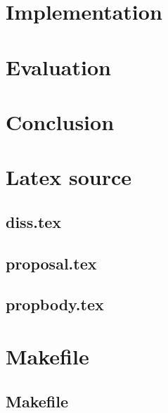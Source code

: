 \documentclass[12pt,twoside,notitlepage]{report}
\begin{document}
\cleardoublepage
\chapter{Implementation}




\cleardoublepage
\chapter{Evaluation}


\cleardoublepage
\chapter{Conclusion}



\cleardoublepage



\cleardoublepage

\appendix

\chapter{Latex source}

\section{diss.tex}
{\scriptsize}

\section{proposal.tex}
{\scriptsize}

\section{propbody.tex}
{\scriptsize}



\cleardoublepage

\chapter{Makefile}

\section{\label{makefile}Makefile}
{\scriptsize}
\end{document}
